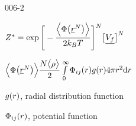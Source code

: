 \begin{mitframe}{006-2} %

    
    \begin{listone}
    
    	\item $\configint = \exp\Bigg[-\dfrac{\Big\langle\pot\big(\uline{\pos}^{\nummoles}\big)\Big\rangle}{2\boltz\Temp}\Bigg]^{\nummoles}\big[\uline{\freevol}\big]^{\nummoles}$
    
    
    
    
    	\begin{listtwo}
    
    		\item $\Big\langle\pot\big(\uline{\pos}^{\nummoles}\big)\Big\rangle \dfrac{\nummoles\big\langle\dens\big\rangle}{2}\int\limits_{0}^{\infty}\potfunc\raddist4\pie\pos^2\mathrm{d}\pos $
        
        
				\begin{listthree}

    				\item $\raddist$, radial distribution function 
    				\item $\potfunc$, potential function
    	
        		\end{listthree}
    
    	\end{listtwo}
    
    \end{listone}
    
\end{mitframe}